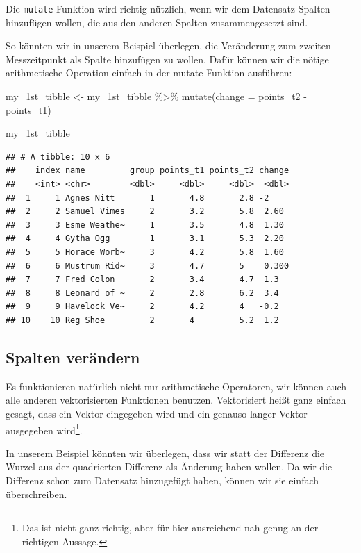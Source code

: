 \documentclass[
]{book}
\newenvironment{Shaded}{\begin{snugshade}}{\end{snugshade}}
\newcommand{\AttributeTok}[1]{\textcolor[rgb]{0.77,0.63,0.00}{#1}}
\newcommand{\FunctionTok}[1]{\textcolor[rgb]{0.00,0.00,0.00}{#1}}
\newcommand{\NormalTok}[1]{#1}
\newcommand{\OtherTok}[1]{\textcolor[rgb]{0.56,0.35,0.01}{#1}}
\newcommand{\SpecialCharTok}[1]{\textcolor[rgb]{0.00,0.00,0.00}{#1}}
\begin{document}
Die \texttt{mutate}-Funktion wird richtig nützlich, wenn wir dem Datensatz Spalten hinzufügen wollen, die aus den anderen Spalten zusammengesetzt sind.

So könnten wir in unserem Beispiel überlegen, die Veränderung zum zweiten Messzeitpunkt als Spalte hinzufügen zu wollen. Dafür können wir die nötige arithmetische Operation einfach in der mutate-Funktion ausführen:

\begin{Shaded}
\begin{Highlighting}[]
\NormalTok{my\_1st\_tibble }\OtherTok{\textless{}{-}}\NormalTok{ my\_1st\_tibble }\SpecialCharTok{\%\textgreater{}\%} 
  \FunctionTok{mutate}\NormalTok{(}\AttributeTok{change =}\NormalTok{ points\_t2 }\SpecialCharTok{{-}}\NormalTok{ points\_t1)}

\NormalTok{my\_1st\_tibble}
\end{Highlighting}
\end{Shaded}

\begin{verbatim}
## # A tibble: 10 x 6
##    index name         group points_t1 points_t2 change
##    <int> <chr>        <dbl>     <dbl>     <dbl>  <dbl>
##  1     1 Agnes Nitt       1       4.8       2.8 -2    
##  2     2 Samuel Vimes     2       3.2       5.8  2.60 
##  3     3 Esme Weathe~     1       3.5       4.8  1.30 
##  4     4 Gytha Ogg        1       3.1       5.3  2.20 
##  5     5 Horace Worb~     3       4.2       5.8  1.60 
##  6     6 Mustrum Rid~     3       4.7       5    0.300
##  7     7 Fred Colon       2       3.4       4.7  1.3  
##  8     8 Leonard of ~     2       2.8       6.2  3.4  
##  9     9 Havelock Ve~     2       4.2       4   -0.2  
## 10    10 Reg Shoe         2       4         5.2  1.2
\end{verbatim}

\hypertarget{spalten-veruxe4ndern}{%
\subsection{Spalten verändern}\label{spalten-veruxe4ndern}}

Es funktionieren natürlich nicht nur arithmetische Operatoren, wir können auch alle anderen vektorisierten Funktionen benutzen. Vektorisiert heißt ganz einfach gesagt, dass ein Vektor eingegeben wird und ein genauso langer Vektor ausgegeben wird\footnote{Das ist nicht ganz richtig, aber für hier ausreichend nah genug an der richtigen Aussage.}.

In unserem Beispiel könnten wir überlegen, dass wir statt der Differenz die Wurzel aus der quadrierten Differenz als Änderung haben wollen. Da wir die Differenz schon zum Datensatz hinzugefügt haben, können wir sie einfach überschreiben.
\end{document}
